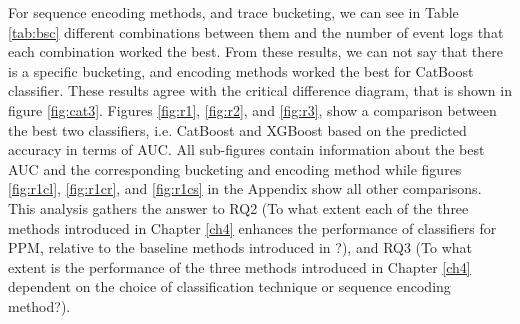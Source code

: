 For sequence encoding methods, and trace bucketing, we can see in Table \ref{tab:bsc}  different combinations between them and the number of event logs that each combination worked the best. From these results, we can not say that there is a specific bucketing, and encoding methods worked the best for CatBoost classifier. These results agree with the critical difference diagram, that is shown in figure \ref{fig:cat3}. Figures \ref{fig:r1}, \ref{fig:r2}, and \ref{fig:r3}, show a comparison between the best two classifiers, i.e. CatBoost and XGBoost based on the predicted accuracy in terms of AUC.  All sub-figures contain information about the best AUC and the corresponding bucketing and encoding method while figures \ref{fig:r1cl}, \ref{fig:r1cr}, and \ref{fig:r1cs} in the Appendix show all other comparisons. This analysis gathers the answer to RQ2 (To what extent each of the three methods introduced in Chapter \ref{ch4} enhances the performance of classifiers for PPM, relative to the baseline methods introduced in \cite{teinemaa2019outcome}?), and RQ3 (To what extent is the performance of the three methods introduced in Chapter \ref{ch4} dependent on the choice of classification technique or sequence encoding method?).












	

		

                                                         



